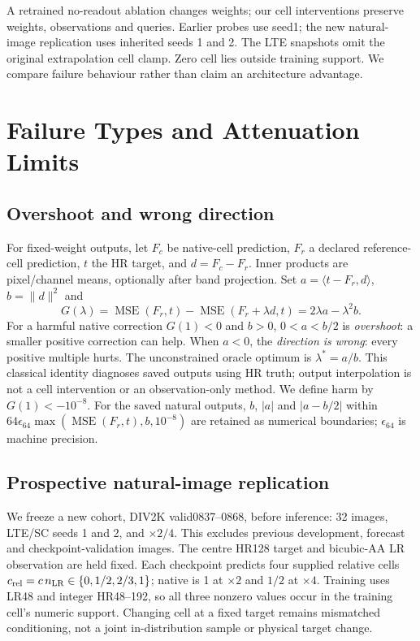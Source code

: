 A retrained no-readout ablation changes weights; our cell interventions
preserve weights, observations and queries. Earlier probes use seed1;
the new natural-image replication uses inherited seeds 1 and 2. The LTE
snapshots omit the original extrapolation cell clamp. Zero cell lies
outside training support. We compare failure behaviour rather than claim
an architecture advantage.

\section{Failure Types and Attenuation Limits}
\label{sec:failure}
\subsection{Overshoot and wrong direction}
For fixed-weight outputs, let $F_c$ be native-cell prediction, $F_r$
a declared reference-cell prediction, $t$ the HR target, and $d=F_c-F_r$. Inner products
are pixel/channel means, optionally after band projection. Set
$a=\langle t-F_r,d\rangle$, $b=\|d\|^2$ and
\begin{equation}
 G(\lambda)=\operatorname{MSE}(F_r,t)-\operatorname{MSE}(F_r+\lambda d,t)
             =2\lambda a-\lambda^2b.
 \label{eq:gain}
\end{equation}
For a harmful native correction $G(1)<0$ and $b>0$, $0<a<b/2$ is
\emph{overshoot}: a smaller positive correction can help. When $a<0$,
the \emph{direction is wrong}: every positive multiple hurts. The unconstrained oracle
optimum is $\lambda^*=a/b$. This classical identity diagnoses saved
outputs using HR truth; output interpolation is not a cell intervention
or an observation-only method. We define harm by $G(1)<-10^{-8}$. For the saved natural outputs,
$b$, $|a|$ and $|a-b/2|$ within
$64\epsilon_{64}\max(\operatorname{MSE}(F_r,t),b,10^{-8})$
are retained as numerical boundaries; $\epsilon_{64}$ is machine precision.

\subsection{Prospective natural-image replication}
We freeze a new cohort, DIV2K valid0837--0868, before inference: 32 images,
LTE/SC seeds 1 and 2, and $\times2/4$. This excludes previous development, forecast and checkpoint-validation
images. The centre HR128 target and bicubic-AA
LR observation are held fixed. Each checkpoint predicts four supplied
relative cells $c_{\rm rel}=c\,n_{\rm LR}\in\{0,1/2,2/3,1\}$; native
is 1 at $\times2$ and $1/2$ at $\times4$. Training uses LR48 and integer
HR48--192, so all three nonzero values occur in the training cell's
numeric support. Changing cell at a fixed target remains mismatched
conditioning, not a joint in-distribution sample or physical target change.

